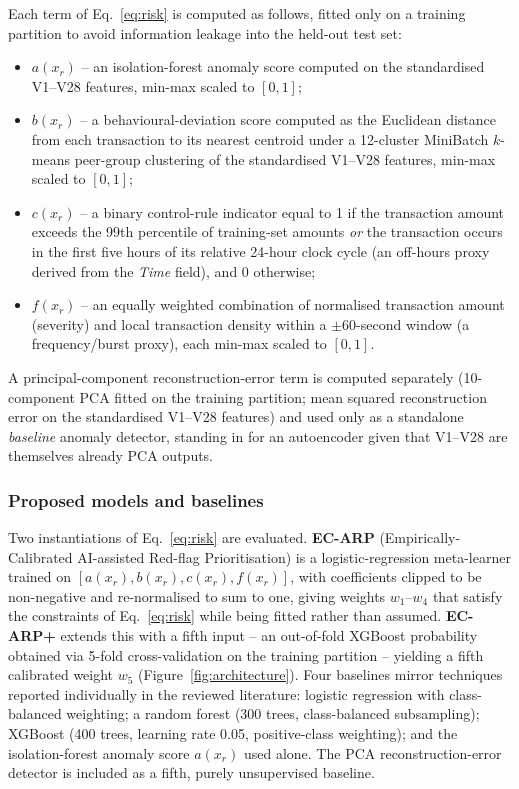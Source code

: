 \documentclass[preprint,12pt]{elsarticle}
\begin{document}
Each term of Eq.~\eqref{eq:risk} is computed as follows, fitted only on a training partition to avoid information leakage into the held-out test set:
\begin{itemize}
    \item $a(x_r)$ -- an isolation-forest anomaly score \citep{liu2008} computed on the standardised V1--V28 features, min-max scaled to $[0,1]$;
    \item $b(x_r)$ -- a behavioural-deviation score computed as the Euclidean distance from each transaction to its nearest centroid under a 12-cluster MiniBatch $k$-means peer-group clustering of the standardised V1--V28 features, min-max scaled to $[0,1]$;
    \item $c(x_r)$ -- a binary control-rule indicator equal to 1 if the transaction amount exceeds the 99th percentile of training-set amounts \emph{or} the transaction occurs in the first five hours of its relative 24-hour clock cycle (an off-hours proxy derived from the \emph{Time} field), and 0 otherwise;
    \item $f(x_r)$ -- an equally weighted combination of normalised transaction amount (severity) and local transaction density within a $\pm$60-second window (a frequency/burst proxy), each min-max scaled to $[0,1]$.
\end{itemize}
A principal-component reconstruction-error term is computed separately (10-component PCA fitted on the training partition; mean squared reconstruction error on the standardised V1--V28 features) and used only as a standalone \emph{baseline} anomaly detector, standing in for an autoencoder given that V1--V28 are themselves already PCA outputs.

\subsubsection{Proposed models and baselines}

Two instantiations of Eq.~\eqref{eq:risk} are evaluated. \textbf{EC-ARP} (Empirically-Calibrated AI-assisted Red-flag Prioritisation) is a logistic-regression meta-learner trained on $[a(x_r), b(x_r), c(x_r), f(x_r)]$, with coefficients clipped to be non-negative and re-normalised to sum to one, giving weights $w_1$--$w_4$ that satisfy the constraints of Eq.~\eqref{eq:risk} while being fitted rather than assumed. \textbf{EC-ARP+} extends this with a fifth input -- an out-of-fold XGBoost \citep{chen2016} probability obtained via 5-fold cross-validation on the training partition -- yielding a fifth calibrated weight $w_5$ (Figure~\ref{fig:architecture}). Four baselines mirror techniques reported individually in the reviewed literature: logistic regression with class-balanced weighting; a random forest \citep{breiman2001} (300 trees, class-balanced subsampling); XGBoost \citep{chen2016} (400 trees, learning rate 0.05, positive-class weighting); and the isolation-forest \citep{liu2008} anomaly score $a(x_r)$ used alone. The PCA reconstruction-error detector is included as a fifth, purely unsupervised baseline.
\end{document}
